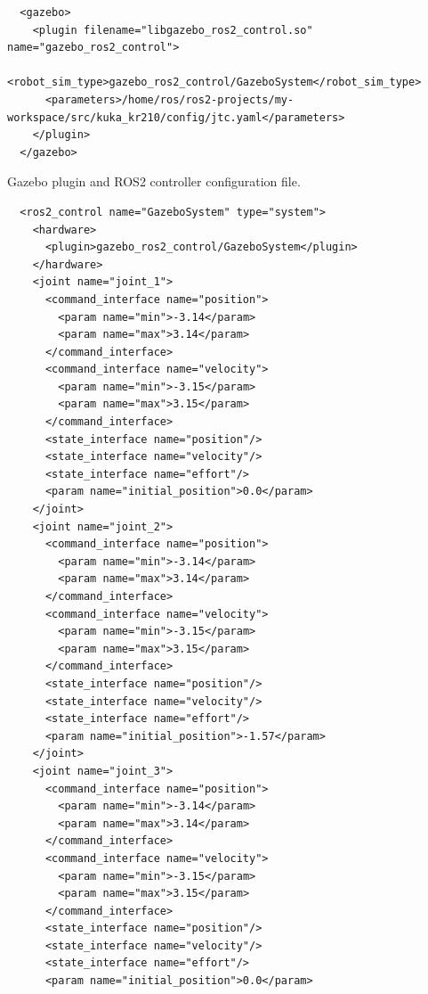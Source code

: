 \documentclass[12pt,oneside]{article}
\begin{document}
\begin{listing}[htbp]
\begin{verbatim} 
  <gazebo>
    <plugin filename="libgazebo_ros2_control.so" name="gazebo_ros2_control">
      <robot_sim_type>gazebo_ros2_control/GazeboSystem</robot_sim_type>
      <parameters>/home/ros/ros2-projects/my-workspace/src/kuka_kr210/config/jtc.yaml</parameters>
    </plugin>
  </gazebo>
\end{verbatim}
\caption{Gazebo plugin and ROS2 controller configuration file.}
\label{gazeboPluginControllerConfigFile}
\end{listing}


\begin{mdframed}[linecolor=black, topline=false, bottomline=false,leftline=false, rightline=false, backgroundcolor=white]
\begin{verbatim} 
  <ros2_control name="GazeboSystem" type="system">
    <hardware>
      <plugin>gazebo_ros2_control/GazeboSystem</plugin>
    </hardware>
    <joint name="joint_1">
      <command_interface name="position">
        <param name="min">-3.14</param>
        <param name="max">3.14</param>
      </command_interface>
      <command_interface name="velocity">
        <param name="min">-3.15</param>
        <param name="max">3.15</param>
      </command_interface>
      <state_interface name="position"/>
      <state_interface name="velocity"/>
      <state_interface name="effort"/>
      <param name="initial_position">0.0</param>
    </joint>
    <joint name="joint_2">
      <command_interface name="position">
        <param name="min">-3.14</param>
        <param name="max">3.14</param>
      </command_interface>
      <command_interface name="velocity">
        <param name="min">-3.15</param>
        <param name="max">3.15</param>
      </command_interface>
      <state_interface name="position"/>
      <state_interface name="velocity"/>
      <state_interface name="effort"/>
      <param name="initial_position">-1.57</param>
    </joint>
    <joint name="joint_3">
      <command_interface name="position">
        <param name="min">-3.14</param>
        <param name="max">3.14</param>
      </command_interface>
      <command_interface name="velocity">
        <param name="min">-3.15</param>
        <param name="max">3.15</param>
      </command_interface>
      <state_interface name="position"/>
      <state_interface name="velocity"/>
      <state_interface name="effort"/>
      <param name="initial_position">0.0</param>

\end{verbatim}
\end{mdframed}
\end{document}
